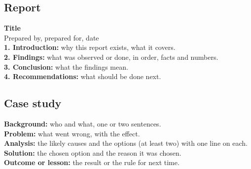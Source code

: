 \documentclass[11pt,a4paper]{article}
\begin{document}
\subsection{Report}
\begin{shaded}
\small
\textbf{Title}\\
Prepared by, prepared for, date\\
\textbf{1. Introduction:} why this report exists, what it covers.\\
\textbf{2. Findings:} what was observed or done, in order, facts and numbers.\\
\textbf{3. Conclusion:} what the findings mean.\\
\textbf{4. Recommendations:} what should be done next.
\end{shaded}

\subsection{Case study}
\begin{shaded}
\small
\textbf{Background:} who and what, one or two sentences.\\
\textbf{Problem:} what went wrong, with the effect.\\
\textbf{Analysis:} the likely causes and the options (at least two) with one line on each.\\
\textbf{Solution:} the chosen option and the reason it was chosen.\\
\textbf{Outcome or lesson:} the result or the rule for next time.
\end{shaded}

\clearpage
\end{document}
